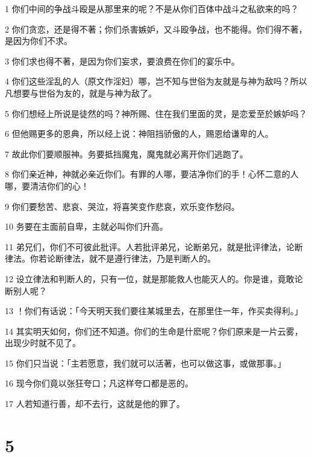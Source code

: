 \par 1 你们中间的争战斗殴是从那里来的呢？不是从你们百体中战斗之私欲来的吗？
\par 2 你们贪恋，还是得不著；你们杀害嫉妒，又斗殴争战，也不能得。你们得不著，是因为你们不求。
\par 3 你们求也得不著，是因为你们妄求，要浪费在你们的宴乐中。
\par 4 你们这些淫乱的人（原文作淫妇）哪，岂不知与世俗为友就是与神为敌吗？所以凡想要与世俗为友的，就是与神为敌了。
\par 5 你们想经上所说是徒然的吗？神所赐、住在我们里面的灵，是恋爱至於嫉妒吗？
\par 6 但他赐更多的恩典，所以经上说：神阻挡骄傲的人，赐恩给谦卑的人。
\par 7 故此你们要顺服神。务要抵挡魔鬼，魔鬼就必离开你们逃跑了。
\par 8 你们亲近神，神就必亲近你们。有罪的人哪，要洁净你们的手！心怀二意的人哪，要清洁你们的心！
\par 9 你们要愁苦、悲哀、哭泣，将喜笑变作悲哀，欢乐变作愁闷。
\par 10 务要在主面前自卑，主就必叫你们升高。
\par 11 弟兄们，你们不可彼此批评。人若批评弟兄，论断弟兄，就是批评律法，论断律法。你若论断律法，就不是遵行律法，乃是判断人的。
\par 12 设立律法和判断人的，只有一位，就是那能救人也能灭人的。你是谁，竟敢论断别人呢？
\par 13 ！你们有话说：「今天明天我们要往某城里去，在那里住一年，作买卖得利。」
\par 14 其实明天如何，你们还不知道。你们的生命是什麽呢？你们原来是一片云雾，出现少时就不见了。
\par 15 你们只当说：「主若愿意，我们就可以活著，也可以做这事，或做那事。」
\par 16 现今你们竟以张狂夸口；凡这样夸口都是恶的。
\par 17 人若知道行善，却不去行，这就是他的罪了。

\chapter{5}

